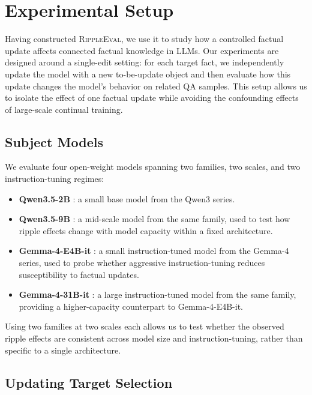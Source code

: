 \section{Experimental Setup}
\label{sec:setup}


Having constructed \textsc{RippleEval}, we use it to study how a controlled factual update affects connected factual knowledge in LLMs. Our experiments are designed around a single-edit setting: for each target fact, we independently update the model with a new to-be-update object and then evaluate how this update changes the model's behavior on related QA samples. This setup allows us to isolate the effect of one factual update while avoiding the confounding effects of large-scale continual training.

\subsection{Subject Models}

We evaluate four open-weight models spanning two families, two scales, and two instruction-tuning regimes:

\begin{itemize}
    \setlength\itemsep{0em}
    \item \textbf{Qwen3.5-2B} \cite{qwen3report}: a small base model from the Qwen3 series.
    \item \textbf{Qwen3.5-9B} \cite{qwen3report}: a mid-scale model from the same family, used to test how ripple effects change with model capacity within a fixed architecture.
    \item \textbf{Gemma-4-E4B-it} \cite{gemma4report}: a small instruction-tuned model from the Gemma-4 series, used to probe whether aggressive instruction-tuning reduces susceptibility to factual updates.
    \item \textbf{Gemma-4-31B-it} \cite{gemma4report}: a large instruction-tuned model from the same family, providing a higher-capacity counterpart to Gemma-4-E4B-it.
\end{itemize}

Using two families at two scales each allows us to test whether the observed ripple effects are consistent across model size and instruction-tuning, rather than specific to a single architecture.

\subsection{Updating Target Selection}

